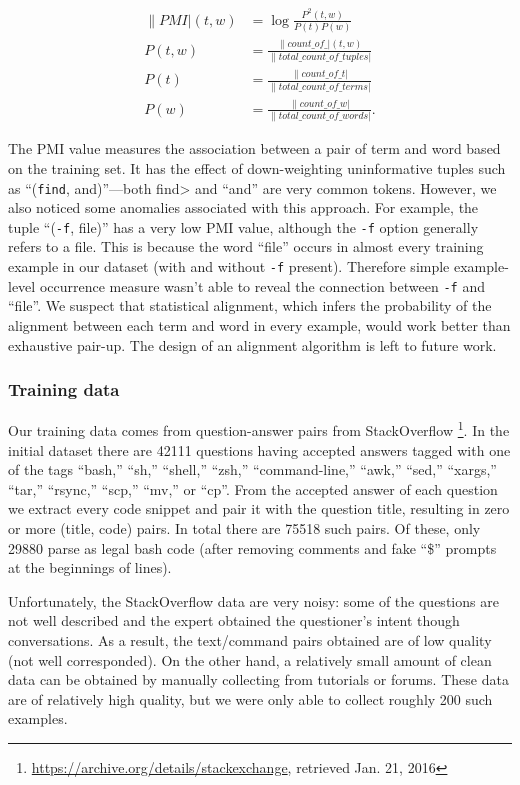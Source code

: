 \begin{align}
	\|PMI|(t, w) &= \log{\frac{P^2(t,w)}{P(t)P(w)}} \\
	P(t, w) &= \frac{\|count\_of\_|(t,w)}{\|total\_count\_of\_tuples|} \\
	P(t) &= \frac{\|count\_of\_t|}{\|total\_count\_of\_terms|} \\
	P(w) &= \frac{\|count\_of\_w|}{\|total\_count\_of\_words|}.
\end{align}

The PMI value measures the association between a pair of term and word based on the training set. It has the effect of down-weighting uninformative tuples such as ``(\texttt{find}, and)''---both \<find> and ``and'' are very common tokens. However, we also noticed some anomalies associated with this approach. For example, the tuple ``(\texttt{-f}, file)'' has a very low PMI value, although the \texttt{-f} option generally refers to a file. This is because the word ``file'' occurs in almost every training example in our dataset (with and without \texttt{-f} present). Therefore simple example-level occurrence measure wasn't able to reveal the connection between \texttt{-f} and ``file''. We suspect that statistical alignment, which infers the probability of the alignment between each term and word in every example, would work better than exhaustive pair-up. The design of an alignment algorithm is left to future work.

\subsubsection{Training data}

Our training data comes from question-answer pairs from StackOverflow%
\footnote{\url{https://archive.org/details/stackexchange}, retrieved Jan. 21,
2016}. In the initial dataset there are 42111 questions having accepted answers
tagged with one of the
tags ``bash,'' ``sh,'' ``shell,'' ``zsh,'' ``command-line,'' ``awk,'' ``sed,''
``xargs,'' ``tar,'' ``rsync,'' ``scp,'' ``mv,'' or ``cp''. From the accepted
answer of each question we extract every code snippet and pair it with the
question title, resulting in zero or more (title, code) pairs. In total there
are 75518 such pairs. Of these, only 29880 parse as legal bash code (after
removing comments and fake ``\$'' prompts at the beginnings of lines).

Unfortunately, the StackOverflow data are very noisy: some of the questions are not well described and the expert obtained the questioner's intent though conversations. As a result, the text/command pairs obtained are of low quality (not well corresponded). On the other hand, a relatively small amount of clean data can be obtained by manually collecting from tutorials or forums. These data are of relatively high quality, but we were only able to collect roughly 200 such examples.

